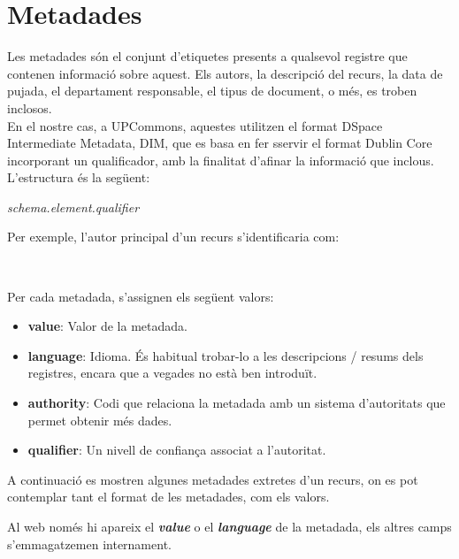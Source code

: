 \section{Metadades}\label{sec:metadata}

Les metadades són el conjunt d'etiquetes presents a qualsevol registre que contenen informació sobre aquest.
Els autors, la descripció del recurs, la data de pujada, el departament responsable, el tipus de document, o més, es troben inclosos. \\

\noindent
En el nostre cas, a \gls{UPCommons}, aquestes utilitzen el format \gls{DSpace} Intermediate Metadata, \gls{DIM}, que es basa en fer sservir el format Dublin Core incorporant un qualificador, amb la finalitat d'afinar la informació que inclous.
L'estructura és la següent:

\begin{center}
    \textit{schema.element.qualifier} \\
\end{center}

\noindent
Per exemple, l'autor principal d'un recurs s'identificaria com:

\begin{center}
     \\
\end{center}

\noindent
Per cada metadada, s'assignen els següent valors:

\begin{itemize}
    \item \textbf{value}: Valor de la metadada.
    \item \textbf{language}: Idioma.
    És habitual trobar-lo a les descripcions / resums dels registres, encara que a vegades no està ben introduït.
    \item \textbf{authority}: Codi que relaciona la metadada amb un sistema d'autoritats que permet obtenir més dades.
    \item \textbf{qualifier}: Un nivell de confiança associat a l'autoritat.
\end{itemize}

\clearpage

\noindent
A continuació es mostren algunes metadades extretes d'un recurs, on es pot contemplar tant el format de les metadades, com els valors. \\

\begin{tcolorbox}[colback=green!5!white, colframe=green!50!black, title=Metadades]
    Al web només hi apareix el \textbf{\textit{value}} o el \textbf{\textit{language}} de la metadada, els altres camps s'emmagatzemen internament.
\end{tcolorbox}

